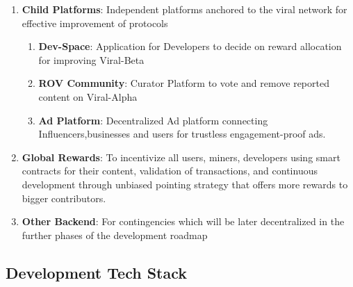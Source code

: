 \documentclass[10pt]{article}
\begin{document}
\begin{enumerate}
\item \textbf{Child Platforms}: Independent platforms anchored to the viral network for effective improvement of protocols

\begin{enumerate}

\item \textbf{Dev-Space}: Application for Developers to decide on reward allocation for improving Viral-Beta
\item \textbf{ROV Community}: Curator Platform to vote and remove reported content on Viral-Alpha
\item \textbf{Ad Platform}: Decentralized Ad platform connecting Influencers,businesses and users for trustless engagement-proof ads.

\end{enumerate}

\item \textbf{Global Rewards}: To incentivize all users, miners, developers using smart contracts for their content, validation of transactions, and continuous development through unbiased pointing strategy that offers more rewards to bigger contributors.


\item \textbf{Other Backend}: For contingencies which will be later decentralized in the further phases of the development roadmap

	

\end{enumerate}

	\subsection{Development Tech Stack}
\end{document}
